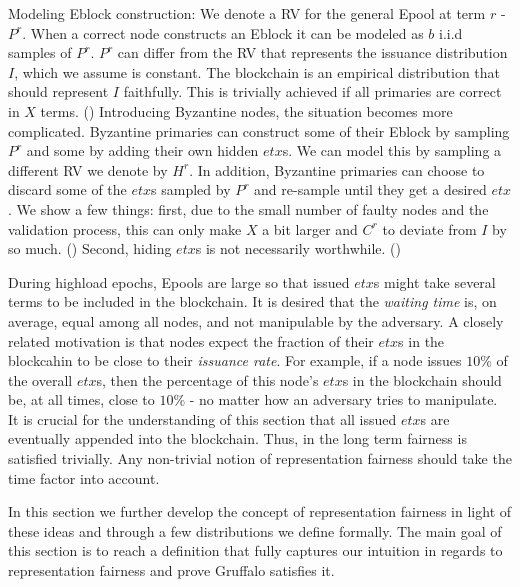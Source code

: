 Modeling Eblock construction:
We denote a RV for the general Epool at term $r$ - $P^r$. When a correct node constructs an Eblock it can be modeled as $b$ i.i.d samples of $P^r$. $P^r$ can differ from the RV that represents the issuance distribution $I$, which we assume is constant. The blockchain is an empirical distribution that should represent $I$ faithfully. This is trivially achieved if all primaries are correct in $X$ terms. () Introducing Byzantine nodes, the situation becomes more complicated. Byzantine primaries can construct some of their Eblock by sampling $P^r$ and some by adding their own hidden $etx$s. We can model this by sampling a different RV we denote by $H^r$. In addition, Byzantine primaries can choose to discard some of the $etx$s sampled by $P^r$ and re-sample until they get a desired $etx$. We show a few things: first, due to the small number of faulty nodes and the validation process, this can only make $X$ a bit larger and $C^r$ to deviate from $I$ by so much. () Second, hiding $etx$s is not necessarily worthwhile. () 


During highload epochs, Epools are large so that issued $etx$s might take several terms to be included in the blockchain. It is desired that the \emph{waiting time} is, on average, equal among all nodes, and not manipulable by the adversary. A closely related motivation is that nodes expect the fraction of their $etx$s in the blockcahin to be close to their \emph{issuance rate}. For example, if a node issues $10\%$ of the overall $etx$s, then the percentage of this node's $etx$s in the blockchain should be, at all times, close to $10\%$ - no matter how an adversary tries to manipulate. It is crucial for the understanding of this section that all issued $etx$s are eventually appended into the blockchain. Thus, in the long term fairness is satisfied trivially. Any non-trivial notion of representation fairness should take the time factor into account.  

In this section we further develop the concept of representation fairness in light of these ideas and through a few distributions we define formally. The main goal of this section is to reach a definition that fully captures our intuition in regards to representation fairness and prove Gruffalo satisfies it. 

